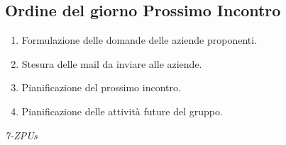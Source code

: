 \documentclass[a4paper,12pt]{article}
\begin{document}
\subsection{Ordine del giorno Prossimo Incontro}
\begin{enumerate}
    \item Formulazione delle domande delle aziende proponenti.
    \item Stesura delle mail da inviare alle aziende.
    \item Pianificazione del prossimo incontro.
    \item Pianificazione delle attività future del gruppo.
\end{enumerate}

\vfill
\begin{flushright}
    \textit{7-ZPUs}
\end{flushright}
\end{document}
